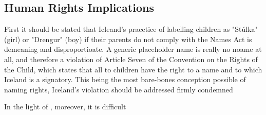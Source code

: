 \subsection{Human Rights Implications}

First it should be stated that Icleand's pracetice of labelling children as "Stúlka" (girl) or "Drengur" (boy) if their parents do not comply with the Names Act is demeaning and disproportioate. A generic placeholder name is really no noame at all, and therefore a violation of Article Seven of the Convention on the Rights of the Child, which states that all to children have the right to a name and to which Iceland is a signatory. This being the most bare-bones conception possible of naming rights, Iceland's violation should be addressed firmly condemned 

In the light of \parencite{raihman10}, moreover, it is difficult
